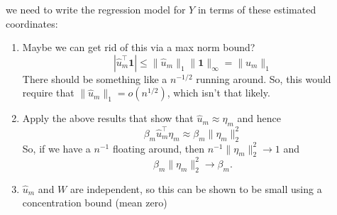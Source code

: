 \documentclass[11pt]{article}
\newcommand{\norm}[1]{\lVert #1 \rVert}
\begin{document}
\begin{enumerate}
we need to write the regression model for $Y$ in terms of these estimated coordinates:
\begin{enumerate}
\item Maybe we can get rid of this via a max norm bound?
\begin{equation}
| \hat{u}_m^{\top}\mathbf{1}| \leq  \norm{\hat{u}_m}_1\norm{\mathbf{1}}_{\infty} =  \norm{\hat{u}_m}_1
\end{equation}
There should be something like a $n^{-1/2}$ running around.  So, this would require that $\norm{\hat{u}_m}_1 = o(n^{1/2})$, which isn't that likely.
\item Apply the above results that show that $\hat{u}_m \approx \eta_m$ and hence 
\[
 \beta_m  \hat{u}_m^{\top}\eta_m 
 \approx  \beta_m \norm{\eta_m}_2^2 
\]
So, if we have a $n^{-1}$ floating around, then $n^{-1}\norm{\eta_m}_2^2 \rightarrow 1$ and
\[
 \beta_m \norm{\eta_m}_2^2  \rightarrow \beta_m.
\]
\item $\hat{u}_m$ and $W$ are independent, so this can be shown to be small using a concentration bound (mean zero)
\end{enumerate}
\end{enumerate}

\end{document}
